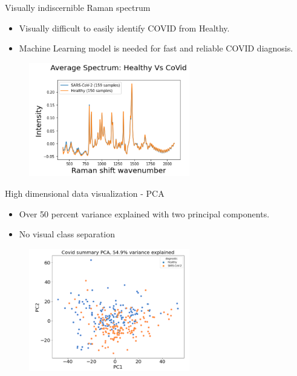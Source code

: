 \begin{frame}{Visually indiscernible Raman spectrum}
\begin{itemize}
    \item Visually difficult to easily identify COVID from Healthy.
    \item Machine Learning model is needed for fast and reliable COVID diagnosis.
\end{itemize}
\begin{figure}
		\includegraphics[width=7.0cm]{figures/Raman_average_spectra.PNG}
	\end{figure}

\end{frame}

\begin{frame}{High dimensional data visualization - PCA}
\begin{itemize}
    \item Over 50 percent variance explained with two principal components.
    \item No visual class separation
\end{itemize}
\begin{figure}
		\includegraphics[width=7.0cm]{figures/pca_2_components.PNG}
	\end{figure}

\end{frame}


